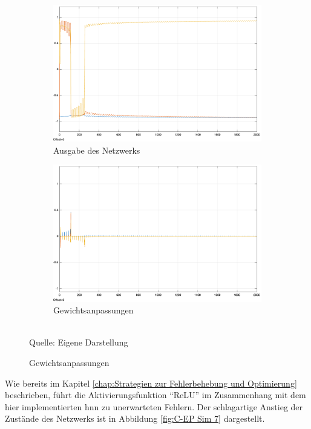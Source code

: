 \begin{figure}[h]
  \caption{Simulationen des \ac{c-ep} mit der Aktivierungsfunktion: \(\rho(x)=tanh(2x)\)}
  \centering
  \begin{subfigure}[b]{0.5\textwidth}
    \includegraphics[width=\textwidth]{abbildungen/c_ep_sim_6_ausgabe.png}
    \caption{Ausgabe des Netzwerks}
  \end{subfigure}%
  \hfill
  \begin{subfigure}[b]{0.5\textwidth}
    \includegraphics[width=\textwidth]{abbildungen/c_ep_sim_6_weight_update.png}
    \caption{Gewichtsanpassungen}
  \end{subfigure}
  \\
  Quelle: Eigene Darstellung
  \label{fig:C-EP Sim 6}
\end{figure}

Wie bereits im Kapitel \ref{chap:Strategien zur Fehlerbehebung und Optimierung} beschrieben, führt die Aktivierungsfunktion "`ReLU"' im Zusammenhang mit dem hier implementierten \ac{hnn} zu unerwarteten Fehlern. Der schlagartige Anstieg der Zustände des Netzwerks ist in Abbildung \ref{fig:C-EP Sim 7} dargestellt.

